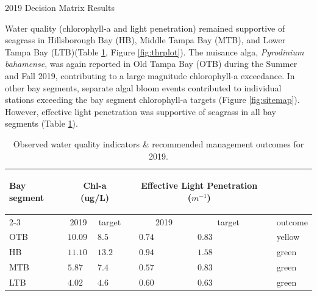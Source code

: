 \documentclass[final,t]{beamer}\usepackage[]{graphicx}\usepackage[]{color}
\begin{document}
\begin{frame}
\begin{columns}[t]
\begin{column}{.65\linewidth}
\begin{block}{2019 Decision Matrix Results}
\begin{minipage}{0.4\textwidth}
\footnotesize
Water quality (chlorophyll-a and light penetration) remained supportive of seagrass in Hillsborough Bay (HB), Middle Tampa Bay (MTB), and Lower Tampa Bay (LTB)(Table \ref{tab:segtab}, Figure \ref{fig:thrplot}). The nuisance alga, \textit{Pyrodinium bahamense}, was again reported in Old Tampa Bay (OTB) during the Summer and Fall 2019, contributing to a large magnitude chlorophyll-a exceedance. In other bay segments, separate algal bloom events contributed to individual stations exceeding the bay segment chlorophyll-a targets (Figure \ref{fig:sitemap}). However, effective light penetration was supportive of seagrass in all bay segments (Table \ref{tab:segtab}).
\end{minipage}
\hspace{0.01in}
\begin{minipage}{0.5\textwidth}
\footnotesize
\begin{table}[!tbp]
\caption{{\footnotesize Observed water quality indicators \& recommended management outcomes for 2019.}\label{tab:segtab}} 
\begin{center}
\begin{tabular}{lp{0.25in}p{0.25in}cp{0.25in}p{0.25in}cp{0.25in}}
\hline\hline
\multicolumn{1}{l}{\bfseries \parbox{0.5cm}{Bay segment}}&\multicolumn{2}{c}{\bfseries Chl-a (ug/L)}&\multicolumn{1}{c}{\bfseries }&\multicolumn{2}{c}{\bfseries \parbox{1.5cm}{Effective Light Penetration ($m^{-1}$)}}&\multicolumn{1}{c}{\bfseries }&\multicolumn{1}{c}{\bfseries }\tabularnewline
\cline{2-3} \cline{5-6}
\multicolumn{1}{l}{}&\multicolumn{1}{c}{2019}&\multicolumn{1}{c}{target}&\multicolumn{1}{c}{}&\multicolumn{1}{c}{2019}&\multicolumn{1}{c}{target}&\multicolumn{1}{c}{}&\multicolumn{1}{c}{\hspace{-0.3cm}\parbox{0.7cm}{outcome}}\tabularnewline
\hline
OTB&$10.09$&$ 8.5$&&$0.74$&$0.83$&&\cellcolor{yellow}yellow\tabularnewline
HB&$11.10$&$13.2$&&$0.94$&$1.58$&&\cellcolor{green}green\tabularnewline
MTB&$ 5.87$&$ 7.4$&&$0.57$&$0.83$&&\cellcolor{green}green\tabularnewline
LTB&$ 4.02$&$ 4.6$&&$0.60$&$0.63$&&\cellcolor{green}green\tabularnewline
\hline
\end{tabular}\end{center}
\end{table}


\end{minipage}
\end{block}
\end{column}
\end{columns}
\end{frame}
\end{document}

